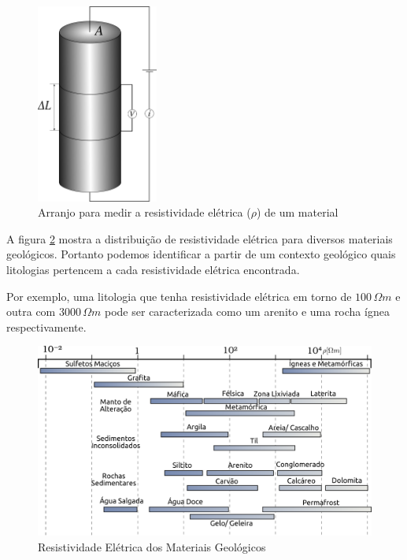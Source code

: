     
    \begin{figure}[h]
        \centering
        \caption{Arranjo para medir a resistividade elétrica ($\rho$) de um material}
        \centerline{\includegraphics[width=4cm]{texto/fig/resisti_telford.png}}
        \label{fig_resistividade}
    \end{figure}
    
    A figura \ref{tabela_resistividade} mostra a distribuição de resistividade elétrica para diversos materiais geológicos. 
    Portanto podemos identificar a partir de um contexto geológico quais litologias pertencem a cada resistividade elétrica encontrada.
    
    Por exemplo, uma litologia que tenha resistividade elétrica em torno de  $100 \, \Omega m$ e outra com $3000 \, \Omega m $ pode ser caracterizada como um arenito e uma rocha ígnea respectivamente. 
    
    \begin{figure}[h]
        \centering
        \caption{Resistividade Elétrica dos Materiais Geológicos}
        \centerline{\includegraphics[width=14cm]{texto/fig/resistividade_tabela.png}}
        \label{tabela_resistividade}
    \end{figure}
    
